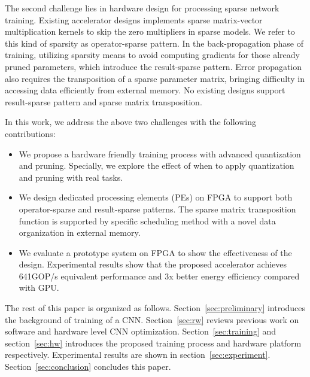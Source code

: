 The second challenge lies in hardware design for processing sparse network training. Existing accelerator designs implements sparse matrix-vector multiplication kernels to skip the zero multipliers in sparse models. We refer to this kind of sparsity as operator-sparse pattern. In the back-propagation phase of training, utilizing sparsity means to avoid computing gradients for those already pruned parameters, which introduce the result-sparse pattern. Error propagation also requires the transposition of a sparse parameter matrix, bringing difficulty in accessing data efficiently from external memory. No existing designs support result-sparse pattern and sparse matrix transposition.

In this work, we address the above two challenges with the following contributions:

\begin{itemize}
  \item We propose a hardware friendly training process with advanced quantization and pruning. Specially, we explore the effect of when to apply quantization and pruning with real tasks.
  \item We design dedicated processing elements (PEs) on FPGA to support both operator-sparse and result-sparse patterns. The sparse matrix transposition function is supported by specific scheduling method with a novel data organization in external memory.
  \item We evaluate a prototype system on FPGA to show the effectiveness of the design. Experimental results show that the proposed accelerator achieves 641GOP/s equivalent performance and 3x better energy efficiency compared with GPU.
\end{itemize}

The rest of this paper is organized as follows. Section~\ref{sec:preliminary} introduces the background of training of a CNN. Section~\ref{sec:rw} reviews previous work on software and hardware level CNN optimization. Section~\ref{sec:training} and section~\ref{sec:hw} introduces the proposed training process and hardware platform respectively. Experimental results are shown in section~\ref{sec:experiment}. Section~\ref{sec:conclusion} concludes this paper.
